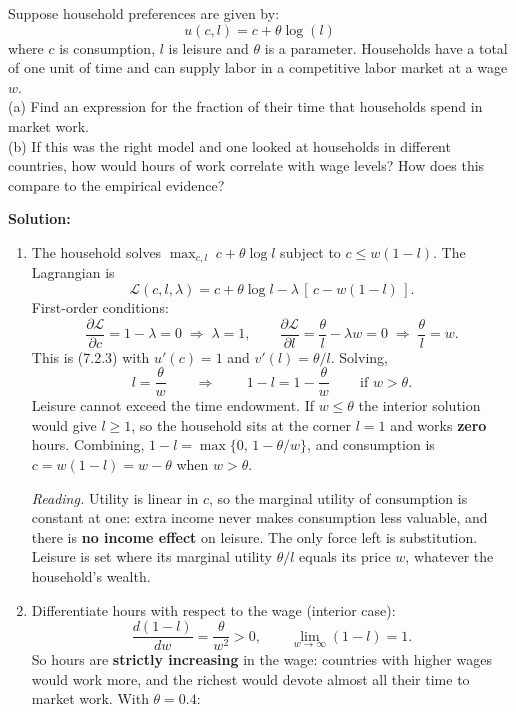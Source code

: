 \documentclass[12pt, letterpaper]{article}
\newcommand{\pd}[2]{\dfrac{\partial #1}{\partial #2}}
\newcommand{\dd}[2]{\dfrac{d #1}{d #2}}
\begin{document}
\begin{tcolorbox}[oddbox,title={Problem 7.1 \quad Labor Supply}]
\begin{tcolorbox}[questionbox]
Suppose household preferences are given by:
\[u(c,l)=c+\theta\log(l)\]
where $c$ is consumption, $l$ is leisure and $\theta$ is a parameter. Households have a total
of one unit of time and can supply labor in a competitive labor market at a wage $w$.\\[3pt]
(a) Find an expression for the fraction of their time that households spend in market work.\\
(b) If this was the right model and one looked at households in different countries, how
would hours of work correlate with wage levels? How does this compare to the empirical
evidence?
\end{tcolorbox}

\textbf{Solution:}

\begin{enumerate}
\item The household solves $\max_{c,l}\;c+\theta\log l$ subject to $c\le w(1-l)$. The
Lagrangian is
\[
\mathcal{L}(c,l,\lambda)=c+\theta\log l-\lambda\,[\,c-w(1-l)\,].
\]
First-order conditions:
\[
\pd{\mathcal L}{c}=1-\lambda=0\;\Rightarrow\;\lambda=1,
\qquad
\pd{\mathcal L}{l}=\frac{\theta}{l}-\lambda w=0\;\Rightarrow\;\frac{\theta}{l}=w .
\]
This is (7.2.3) with $u'(c)=1$ and $v'(l)=\theta/l$. Solving,
\[
l=\frac{\theta}{w}
\qquad\Longrightarrow\qquad
\boxed{\,1-l=1-\frac{\theta}{w}\,}\qquad\text{if } w>\theta .
\]
Leisure cannot exceed the time endowment. If $w\le\theta$ the interior solution would give
$l\ge1$, so the household sits at the corner $l=1$ and works \textbf{zero} hours. Combining,
$1-l=\max\{0,\,1-\theta/w\}$, and consumption is $c=w(1-l)=w-\theta$ when $w>\theta$.

\emph{Reading.} Utility is linear in $c$, so the marginal utility of consumption is
constant at one: extra income never makes consumption less valuable, and there is
\textbf{no income effect} on leisure. The only force left is substitution. Leisure is set
where its marginal utility $\theta/l$ equals its price $w$, whatever the household's wealth.

\item Differentiate hours with respect to the wage (interior case):
\[
\dd{(1-l)}{w}=\frac{\theta}{w^{2}}>0 ,
\qquad
\lim_{w\to\infty}(1-l)=1 .
\]
So hours are \textbf{strictly increasing} in the wage: countries with higher wages would work
more, and the richest would devote almost all their time to market work. With $\theta=0.4$:


\end{enumerate}
\end{tcolorbox}
\end{document}
